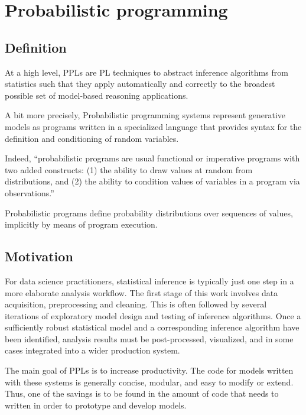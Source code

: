 
\chapter{Probabilistic programming}

\section{Definition} \label{PPL_def}
At a high level, \glspl{PPL} are \gls{PL} techniques to abstract inference algorithms from statistics such that they apply automatically and correctly to the broadest possible set of model-based reasoning applications.

A bit more precisely, Probabilistic programming systems \cite{Goodman:2012uq,dippl,Mansinghka:2014ty,wood-aistats-2014} represent generative models as programs written in a specialized language that provides syntax for the definition and conditioning of random variables.

Indeed, ``probabilistic programs are usual functional or imperative programs with two added constructs: 
(1) the ability to draw values at random from distributions, and 
(2) the ability to condition values of variables in a program via observations.'' \cite{Gordon:2014:PP:2593882.2593900}

Probabilistic programs define probability distributions over sequences of values, implicitly by means of program execution.

\section{Motivation}
For data science practitioners, statistical inference is typically just one step in a more elaborate analysis workflow. The first stage of this work involves data acquisition, preprocessing and cleaning. This is often followed by several iterations of exploratory model design and testing of inference algorithms. Once a sufficiently robust statistical model and a corresponding inference algorithm have been identified, analysis results must be post-processed, visualized, and in some cases integrated into a wider production system.

The main goal of \glspl{PPL} is to increase productivity. 
The code for models written with these systems is generally concise, modular, and easy to modify or extend.
Thus, one of the savings is to be found in the amount of code that needs to written in order to prototype and develop models.

